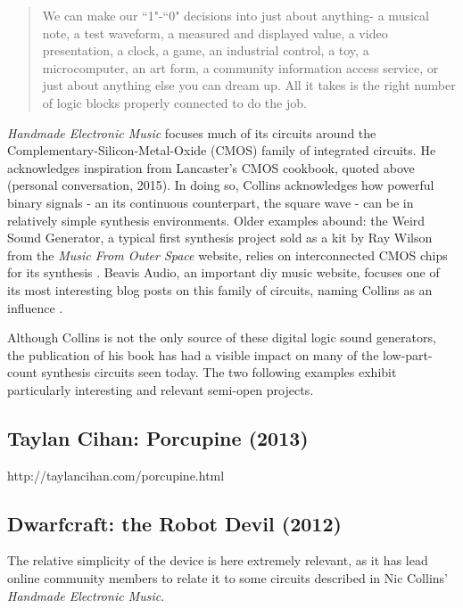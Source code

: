 \begin{quote}
	
	We can make our ``1"-``0" decisions into just about anything- a musical note, a test waveform, a measured and displayed value, a video presentation, a clock, a game, an industrial control, a toy, a microcomputer, an art form, a community information access service, or just about anything else you can dream up. All it takes is the right number of logic blocks properly connected to do the job.
	\citep[pp-7-8]{lancaster1988}
	
\end{quote}

\emph{Handmade Electronic Music} focuses much of its circuits around the Complementary-Silicon-Metal-Oxide (CMOS) family of integrated circuits. He acknowledges inspiration from Lancaster's CMOS cookbook, quoted above (personal conversation, 2015). In doing so, Collins acknowledges how powerful binary signals - an its continuous counterpart, the square wave - can be in relatively simple synthesis environments. Older examples abound: the Weird Sound Generator, a typical first synthesis project sold as a kit by Ray Wilson from the \emph{Music From Outer Space} website, relies on interconnected CMOS chips for its synthesis \citep{wilson2015}. Beavis Audio, an important diy music website, focuses one of its most interesting blog posts on this family of circuits, naming Collins as an influence \citep{beavis2015}. 

Although Collins is not the only source of these digital logic sound generators, the publication of his book has had a visible impact on many of the low-part-count synthesis circuits seen today. The two following examples exhibit particularly interesting and relevant semi-open projects. 

\subsection{Taylan Cihan: Porcupine (2013)}

http://taylancihan.com/porcupine.html

\subsection{Dwarfcraft: the Robot Devil (2012)}

The relative simplicity of the device is here extremely relevant, as it has lead online community members to relate it to some circuits described in Nic Collins' \emph{Handmade Electronic Music}. 

